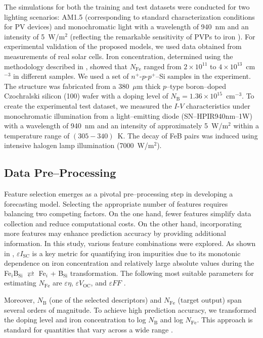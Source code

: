 \documentclass[a4paper,fleqn]{cas-sc}
\begin{document}
The simulations for both the training and test datasets were conducted for two lighting scenarios: AM1.5 (corresponding to standard characterization conditions for PV devices) and monochromatic light with a wavelength of 940~nm and an intensity of 5~W/m$^{2}$ (reflecting the remarkable sensitivity of PVPs to iron \cite{OUR WORK}). 
For experimental validation of the proposed models, we used data obtained from measurements of real solar cells. 
Iron concentration, determined using the methodology described in \cite{Olikh2022:JMatSci, Olikh2021JAP}, showed that $N_\mathrm{Fe}$ ranged from $2\times10^{11}$ to $4\times10^{13}$~cm$^{-3}$ in different samples.
We used a set of $n^+$-$p$-$p^+$--Si samples in the experiment. 
The structure was fabricated from a 380~$\mu$m thick $p$--type boron--doped Czochralski silicon (100) wafer with a doping level of $N_\mathrm{B}=1.36\times10^{15}$~cm$^{-3}$. 
To create the experimental test dataset, we measured the $I$-$V$ characteristics under monochromatic illumination from a light--emitting diode (SN–HPIR940nm–1W) with a wavelength of 940~nm and an intensity of approximately 5~W/m$^{2}$ within a temperature range of $(305-340)$~K. 
The decay of FeB pairs was induced using intensive halogen lamp illumination (7000~W/m$^{2}$).

\subsection{Data Pre--Processing}
\par
Feature selection emerges as a pivotal pre--processing step in developing a forecasting model. 
Selecting the appropriate number of features requires balancing two competing factors. 
On the one hand, fewer features simplify data collection and reduce computational costs. 
On the other hand, incorporating more features may enhance prediction accuracy by providing additional information. 
In this study, various feature combinations were explored. 
As shown in \cite{OUR WORK}, $\varepsilon I_\mathrm{SC}$ is a key metric for quantifying iron impurities due to its monotonic dependence on iron concentration and relatively large absolute values during the Fe$_i$B$_\mathrm{Si}$ $\rightleftarrows$ Fe$_i$ + B$_\mathrm{Si}$ transformation. 
The following most suitable parameters for estimating $N_\mathrm{Fe}$ are $\varepsilon \eta$, $\varepsilon V_\mathrm{OC}$, and $\varepsilon F\!F$ \cite{OUR WORK}. 


Moreover, $N_\mathrm{B}$ (one of the selected descriptors) and $N_\mathrm{Fe}$ (target output) span several orders of magnitude. 
To achieve high prediction accuracy, we transformed the doping level and iron concentration to log $N_\mathrm{B}$ and log $N_\mathrm{Fe}$. 
This approach is standard for quantities that vary across a wide range \cite{Srivastava2023, Minagawa2024}.
\end{document}
